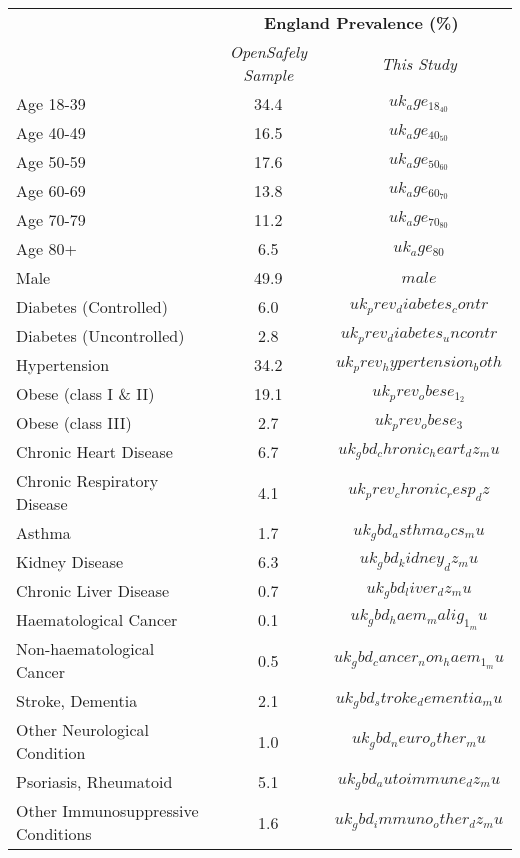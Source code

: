
\begin{tabular}{p{6cm}cc}
& \multicolumn{2}{c}{\textbf{England Prevalence (\%)  }} \\[0.5ex] &
  \emph{OpenSafely Sample} & \emph{This Study} \\[2ex]
Age 18-39 & 34.4 & $$uk_age_18_40$$ \\[0.25ex]
Age 40-49 & 16.5 & $$uk_age_40_50$$ \\[0.25ex]
Age 50-59 & 17.6 & $$uk_age_50_60$$\\[0.25ex]
Age 60-69 & 13.8 & $$uk_age_60_70$$\\[0.25ex]
Age 70-79 & 11.2 & $$uk_age_70_80$$\\[0.25ex]
Age 80+ & 6.5 & $$uk_age_80$$ \\[0.25ex]
Male & 49.9 & $$male$$ \\[0.25ex]
Diabetes (Controlled) & 6.0 & $$uk_prev_diabetes_contr$$ \\[0.25ex]
Diabetes (Uncontrolled) & 2.8 & $$uk_prev_diabetes_uncontr$$ \\[0.25ex]
Hypertension & 34.2 & $$uk_prev_hypertension_both$$ \\[0.25ex]
Obese (class I \& II) & 19.1 & $$uk_prev_obese_1_2$$ \\[0.25ex]
Obese (class III) & 2.7 & $$uk_prev_obese_3$$ \\[0.25ex]
Chronic Heart Disease & 6.7 & $$uk_gbd_chronic_heart_dz_mu$$ \\[0.25ex]
Chronic Respiratory Disease & 4.1 & $$uk_prev_chronic_resp_dz$$
\\[0.25ex]
Asthma & 1.7 & $$uk_gbd_asthma_ocs_mu$$ \\[0.25ex]
Kidney Disease & 6.3 & $$uk_gbd_kidney_dz_mu$$ \\[0.25ex]
Chronic Liver Disease & 0.7 & $$uk_gbd_liver_dz_mu$$ \\[0.25ex]
Haematological Cancer & 0.1 & $$uk_gbd_haem_malig_1_mu$$\\[0.25ex]
Non-haematological Cancer & 0.5 & $$uk_gbd_cancer_non_haem_1_mu$$ \\[0.25ex]
Stroke, Dementia & 2.1 & $$uk_gbd_stroke_dementia_mu$$ \\[0.25ex]
Other Neurological Condition & 1.0 & $$uk_gbd_neuro_other_mu$$ \\[0.25ex]
Psoriasis, Rheumatoid & 5.1 & $$uk_gbd_autoimmune_dz_mu$$ \\[0.25ex]
Other Immunosuppressive Conditions & 1.6 & $$uk_gbd_immuno_other_dz_mu$$ \\[0.25ex]
\end{tabular}
